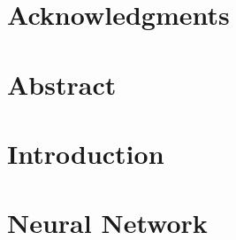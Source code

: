 \documentclass[11pt]{book}
\renewcommand{\baselinestretch}{1.2}
\begin{document}

 

 


\newpage
 \thispagestyle{empty}
\renewcommand{\thesisdedication}{{\large Copyright \copyright~~ The LNMIIT 2017\\}{\large All Rights Reserved\\}}
\thesisdedicationpage



\newpage
\thispagestyle{empty}
\renewcommand{\thesisdedication}{\large Dedicated to our amazing Faculty and supportive Seniors and Peers }
\thesisdedicationpage


\chapter*{Acknowledgments}
\label{ch:ack}


\chapter*{Abstract}
\label{ch:ack}



\tableofcontents

\chapter{Introduction}
\label{ch:intro}


\chapter{Neural Network}
\label{ch:reversible}


%
%
%
%
%
\end{document}

